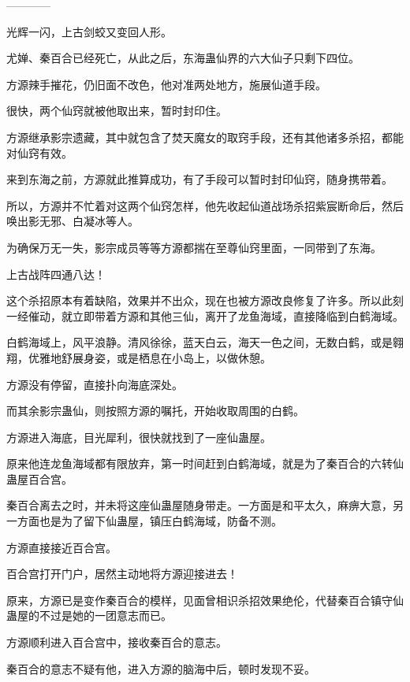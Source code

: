 
\begin{this_body}

------------

光辉一闪，上古剑蛟又变回人形。

尤婵、秦百合已经死亡，从此之后，东海蛊仙界的六大仙子只剩下四位。

方源辣手摧花，仍旧面不改色，他对准两处地方，施展仙道手段。

很快，两个仙窍就被他取出来，暂时封印住。

方源继承影宗遗藏，其中就包含了焚天魔女的取窍手段，还有其他诸多杀招，都能对仙窍有效。

来到东海之前，方源就此推算成功，有了手段可以暂时封印仙窍，随身携带着。

所以，方源并不忙着对这两个仙窍怎样，他先收起仙道战场杀招紫宸断命后，然后唤出影无邪、白凝冰等人。

为确保万无一失，影宗成员等等方源都揣在至尊仙窍里面，一同带到了东海。

上古战阵四通八达！

这个杀招原本有着缺陷，效果并不出众，现在也被方源改良修复了许多。所以此刻一经催动，就立即带着方源和其他三仙，离开了龙鱼海域，直接降临到白鹤海域。

白鹤海域上，风平浪静。清风徐徐，蓝天白云，海天一色之间，无数白鹤，或是翱翔，优雅地舒展身姿，或是栖息在小岛上，以做休憩。

方源没有停留，直接扑向海底深处。

而其余影宗蛊仙，则按照方源的嘱托，开始收取周围的白鹤。

方源进入海底，目光犀利，很快就找到了一座仙蛊屋。

原来他连龙鱼海域都有限放弃，第一时间赶到白鹤海域，就是为了秦百合的六转仙蛊屋百合宫。

秦百合离去之时，并未将这座仙蛊屋随身带走。一方面是和平太久，麻痹大意，另一方面也是为了留下仙蛊屋，镇压白鹤海域，防备不测。

方源直接接近百合宫。

百合宫打开门户，居然主动地将方源迎接进去！

原来，方源已是变作秦百合的模样，见面曾相识杀招效果绝伦，代替秦百合镇守仙蛊屋的不过是她的一团意志而已。

方源顺利进入百合宫中，接收秦百合的意志。

秦百合的意志不疑有他，进入方源的脑海中后，顿时发现不妥。


\end{this_body}
